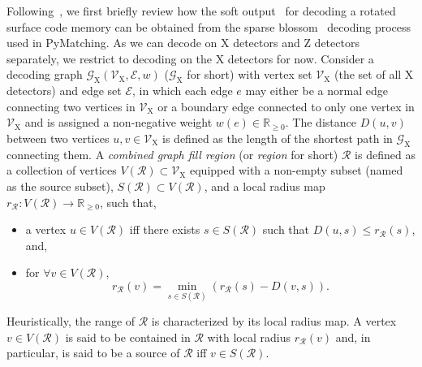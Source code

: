 \documentclass[reprint,aps,twocolumn,superscriptaddress,showpacs,notitlepage,10pt]{revtex4-2}
\theoremstyle{definition}
\begin{document}
Following~\cite{meister_efficient_2024,gidney_how_to_2024}, we first briefly review how the soft output~\cite{meister_efficient_2024} for decoding a rotated surface code memory can be obtained from the sparse blossom~\cite{higgott_sparse_2025} decoding process used in PyMatching. As we can decode on $\mathrm{X}$ detectors and $\mathrm{Z}$ detectors separately,  we restrict to decoding on the X detectors for now. Consider a decoding graph $\mathcal{G}_{\mathrm{X}}(\mathcal{V}_{\mathrm{X}},\mathcal{E},w)$ ($\mathcal{G}_{\mathrm{X}}$ for short) with vertex set $\mathcal{V}_{\mathrm{X}}$ (the set of all $\mathrm{X}$ detectors) and edge set $\mathcal{E}$, in which each edge $e$ may either be a normal edge connecting two vertices in $\mathcal{V}_{\mathrm{X}}$ or a boundary edge connected to only one vertex in $\mathcal{V}_{\mathrm{X}}$ and is assigned a non-negative weight $w(e)\in\mathbb{R}_{\geq 0}$.  The distance $D(u,v)$  between two vertices $u,v\in\mathcal{V}_{\mathrm{X}}$ is defined as the length of the shortest path in $\mathcal{G}_{\mathrm{X}}$ connecting them.  A \textit{combined graph fill region} (or \textit{region} for short) $\mathcal{R}$ is defined as a collection of vertices $V(\mathcal{R})\subset\mathcal{V}_{\mathrm{X}}$ equipped with a non-empty subset (named as the source subset), $S(\mathcal{R})\subset V(\mathcal{R})$, and a local radius map $r_{\mathcal{R}}:V(\mathcal{R})\to\mathbb{R}_{\geq 0}$, such that,
\begin{itemize}
    \item a vertex $u\in V(\mathcal{R})$ iff there exists $s\in S(\mathcal{R})$ such that $D(u,s)\leq r_{\mathcal{R}}(s)$, and, 
    \item for $\forall v\in V(\mathcal{R})$, \[r_{\mathcal{R}}(v)= \min_{s\in S(\mathcal{R})} \left( r_{\mathcal{R}}(s)- D(v,s)\right).\]
\end{itemize}
 Heuristically, the range of $\mathcal{R}$ is characterized by its local radius map. A vertex $v\in V(\mathcal{R})$ is said to be contained in $\mathcal{R}$ with local radius $r_{\mathcal{R}}(v)$ and, in particular, is said to be a source of $\mathcal{R}$ iff $v\in S(\mathcal{R})$.
\end{document}
